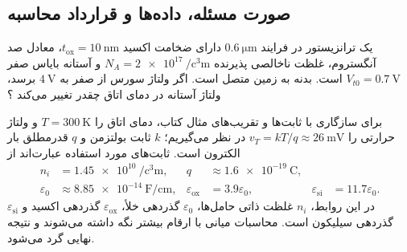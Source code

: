 \subsection*{صورت مسئله، داده‌ها و قرارداد محاسبه}
یک ترانزیستور  در فرایند \(\qty{0.6}{\micro\metre}\) دارای ضخامت اکسید
\(t_{\mathrm{ox}}=\qty{10}{\nano\metre}\)، معادل صد آنگستروم،
غلظت ناخالصی پذیرنده \(N_A=\qty{2e17}{\per\cubic\centi\metre}\)
و آستانه بایاس صفر \(V_{t0}=\qty{0.7}{\volt}\) است.
بدنه به زمین متصل است. اگر ولتاژ سورس از صفر به \(\qty{4}{\volt}\) برسد،
ولتاژ آستانه در دمای اتاق چقدر تغییر می‌کند
\cite[تمرین ، صفحه چاپی ۹۶]{weste}؟

برای سازگاری با ثابت‌ها و تقریب‌های مثال  کتاب، دمای اتاق را \(T=\qty{300}{\kelvin}\)
و ولتاژ حرارتی را \(v_T=kT/q\approx\qty{26}{\milli\volt}\) در نظر می‌گیریم؛
\(k\) ثابت بولتزمن و \(q\) قدرمطلق بار الکترون است.
ثابت‌های مورد استفاده عبارت‌اند از
\cite[صفحات چاپی ۶۵، ۷۹ و ۸۰]{weste}
\begin{align*}
 n_i&=\qty{1.45e10}{\per\cubic\centi\metre},
 &q&\approx\qty{1.6e-19}{\coulomb},\\
 \varepsilon_0&\approx\qty{8.85e-14}{\farad\per\centi\metre},
 &\varepsilon_{\mathrm{ox}}&=3.9\varepsilon_0,
 &\varepsilon_{\mathrm{si}}&=11.7\varepsilon_0.
\end{align*}
در این روابط، \(n_i\) غلظت ذاتی حامل‌ها، \(\varepsilon_0\) گذردهی خلأ،
\(\varepsilon_{\mathrm{ox}}\) گذردهی اکسید و \(\varepsilon_{\mathrm{si}}\) گذردهی سیلیکون است.
محاسبات میانی با ارقام بیشتر نگه داشته می‌شوند و نتیجه نهایی گرد می‌شود.


